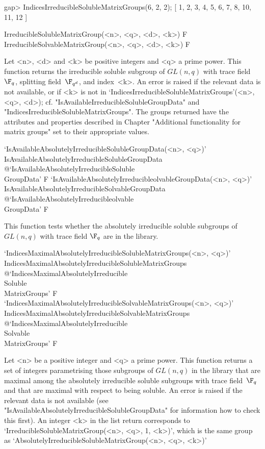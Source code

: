 \beginexample
gap> IndicesIrreducibleSolubleMatrixGroups(6, 2, 2);
[ 1, 2, 3, 4, 5, 6, 7, 8, 10, 11, 12 ]
\endexample

\>IrreducibleSolubleMatrixGroup(<n>, <q>, <d>, <k>) F
\>IrreducibleSolvableMatrixGroup(<n>, <q>, <d>, <k>) F

Let <n>, <d> and <k> be  positive integers and <q> a prime power. This
function returns the irreducible soluble subgroup of $GL(n,q)$ with trace field $\F_q$, 
splitting field~$\F_{q^d}$, and index~<k>.
An error is raised if the relevant
data is not available, or if <k> is not in  
`IndicesIrreducibleSolubleMatrixGroups'(<n>, <q>, <d>); cf. "IsAvailableIrreducibleSolubleGroupData" and "IndicesIrreducibleSolubleMatrixGroups".
The groups returned have the attributes and properties described in
Chapter "Additional functionality for matrix groups" set to their appropriate values.


\>`IsAvailableAbsolutelyIrreducibleSolubleGroupData(<n>, <q>)'%
{IsAvailableAbsolutelyIrreducibleSolubleGroupData}%
@{`IsAvailableAbsolutelyIrreducibleSoluble\\GroupData'} F
\>`IsAvailableAbsolutelyIrreducibleolvableGroupData(<n>, <q>)'%
{IsAvailableAbsolutelyIrreducibleSolvableGroupData}%
@{`IsAvailableAbsolutelyIrreducibleolvable\\GroupData'} F

This function tests whether the
absolutely irreducible soluble subgroups of $GL(n,q)$ with trace field $\F_q$ are in the {\IRREDSOL} library.




\>`IndicesMaximalAbsolutelyIrreducibleSolubleMatrixGroups(<n>, <q>)'%
{IndicesMaximalAbsolutelyIrreducibleSolubleMatrixGroups}%
@{`IndicesMaximalAbsolutelyIrreducible\\Soluble\\MatrixGroups'} F
\>`IndicesMaximalAbsolutelyIrreducibleSolvableMatrixGroups(<n>, <q>)'%
{IndicesMaximalAbsolutelyIrreducibleSolvableMatrixGroups}%
@{`IndicesMaximalAbsolutelyIrreducible\\Solvable\\MatrixGroups'} F

Let <n> be a  positive integer and <q> a prime power. This
function returns a set of integers parametrising those subgroups of $GL(n, q)$ in the
{\IRREDSOL} library that are maximal among the absolutely irreducible soluble subgroups with  trace field~$\F_q $ and that are maximal with
respect to being soluble. An error is raised if the relevant
data is not available (see "IsAvailableAbsolutelyIrreducibleSolubleGroupData" for information 
how to check this first). An integer <k> in the list return corresponds to `IrreducibleSolubleMatrixGroup(<n>, <q>, 1, <k>)', which is the same group as
`AbsolutelyIrreducibleSolubleMatrixGroup(<n>, <q>, <k>)'

